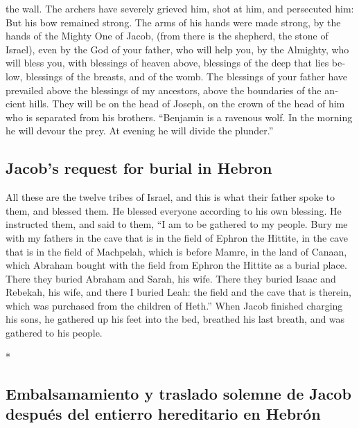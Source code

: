 \begin{paracol}{2}
\begin{otherlanguage}{english}
the wall.  The archers have severely grieved him, shot at
him, and persecuted him:  But his bow remained strong.
The arms of his hands were made strong, by the hands of the Mighty One
of Jacob, (from there is the shepherd, the stone of Israel),
 even by the God of your father, who will help you, by
the Almighty, who will bless you, with blessings of heaven above,
blessings of the deep that lies below, blessings of the breasts, and of
the womb.  The blessings of your father have prevailed
above the blessings of my ancestors, above the boundaries of the ancient
hills. They will be on the head of Joseph, on the crown of the head of
him who is separated from his brothers.  ``Benjamin is a
ravenous wolf. In the morning he will devour the prey. At evening he
will divide the plunder.''

\hypertarget{jacobs-request-for-burial-in-hebron}{%
\subsection{Jacob's request for burial in
Hebron}\label{jacobs-request-for-burial-in-hebron}}

 All these are the twelve tribes of Israel, and this is
what their father spoke to them, and blessed them. He blessed everyone
according to his own blessing.  He instructed them, and
said to them, ``I am to be gathered to my people. Bury me with my
fathers in the cave that is in the field of Ephron the Hittite,
 in the cave that is in the field of Machpelah, which is
before Mamre, in the land of Canaan, which Abraham bought with the field
from Ephron the Hittite as a burial place.  There they
buried Abraham and Sarah, his wife. There they buried Isaac and Rebekah,
his wife, and there I buried Leah:  the field and the
cave that is therein, which was purchased from the children of Heth.''
 When Jacob finished charging his sons, he gathered up
his feet into the bed, breathed his last breath, and was gathered to his
people.

\end{otherlanguage}

\switchcolumn[0]*

\hypertarget{embalsamamiento-y-traslado-solemne-de-jacob-despuuxe9s-del-entierro-hereditario-en-hebruxf3n}{%
\subsection{Embalsamamiento y traslado solemne de Jacob después del
entierro hereditario en
Hebrón}\label{embalsamamiento-y-traslado-solemne-de-jacob-despuuxe9s-del-entierro-hereditario-en-hebruxf3n}}


\end{paracol}
